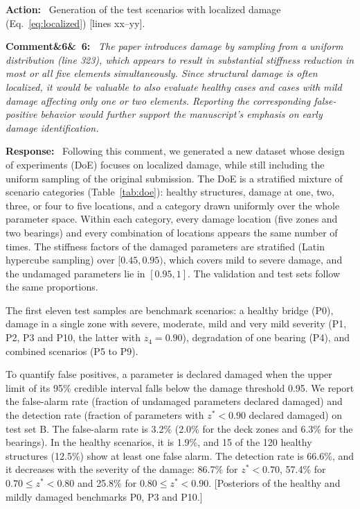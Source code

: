 \documentclass[11pt]{article}
\newenvironment{rcomment}[1]{\par\bigskip\noindent\textbf{Comment\ifx&#1&\else\ #1\fi:}\ \itshape}{\par}
\newenvironment{response}{\par\smallskip\noindent\color{resp}\textbf{Response:}\ }{\par}
\newenvironment{action}{\par\smallskip\noindent\color{resp}\textbf{Action:}\ }{\par}
\newcommand{\tbd}[1]{\textcolor{note}{\textsf{[#1]}}}
\newcommand{\lines}[1]{\tbd{lines #1}}
\begin{document}
\begin{action}
Generation of the test scenarios with localized damage (Eq.~\eqref{eq:localized}) \lines{xx--yy}.
\end{action}

\begin{rcomment}{6}
The paper introduces damage by sampling from a uniform distribution (line 323), which appears to result in substantial
stiffness reduction in most or all five elements simultaneously. Since structural damage is often localized, it would be
valuable to also evaluate healthy cases and cases with mild damage affecting only one or two elements. Reporting the
corresponding false-positive behavior would further support the manuscript's emphasis on early damage identification.
\end{rcomment}

\begin{response}
Following this comment, we generated a new dataset whose design of experiments (DoE) focuses on localized damage, while
still including the uniform sampling of the original submission. The DoE is a stratified mixture of scenario categories
(Table~\ref{tab:doe}): healthy structures, damage at one, two, three, or four to five locations, and a category drawn
uniformly over the whole parameter space. Within each category, every damage location (five zones and two bearings) and
every combination of locations appears the same number of times. The stiffness factors of the damaged parameters are
stratified (Latin hypercube sampling) over $[0.45,0.95)$, which covers mild to severe damage, and the undamaged
parameters lie in $[0.95,1]$. The validation and test sets follow the same proportions.

The first eleven test samples are benchmark scenarios: a healthy bridge (P0), damage in a single zone with severe,
moderate, mild and very mild severity (P1, P2, P3 and P10, the latter with $z_4=0.90$), degradation of one bearing (P4),
and combined scenarios (P5 to P9).

To quantify false positives, a parameter is declared damaged when the upper limit of its 95\% credible interval falls
below the damage threshold 0.95. We report the false-alarm rate (fraction of undamaged parameters declared damaged) and the
detection rate (fraction of parameters with $z^*<0.90$ declared damaged) on test set B. The false-alarm rate is 3.2\%
(2.0\% for the deck zones and 6.3\% for the bearings). In the healthy scenarios, it is 1.9\%, and 15 of the 120 healthy
structures (12.5\%) show at least one false alarm. The detection rate is 66.6\%, and it decreases with the severity of
the damage: 86.7\% for $z^*<0.70$, 57.4\% for $0.70\le z^*<0.80$ and 25.8\% for $0.80\le z^*<0.90$.
\tbd{Posteriors of the healthy and mildly damaged benchmarks P0, P3 and P10.}
\end{response}
\end{document}
